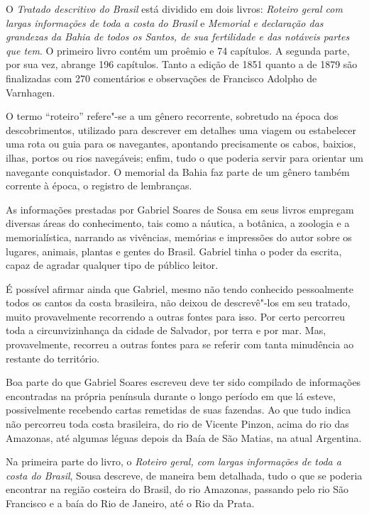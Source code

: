 \documentclass[12pt]{extarticle}
\begin{document}
O \textit{Tratado descritivo do Brasil} está dividido em dois livros: 
\textit{Roteiro geral com largas informações de toda a costa do Brasil} e \textit{Memorial e declaração das grandezas da Bahia de todos os Santos, de sua fertilidade e das notáveis partes que tem}. O primeiro livro contém um proêmio e 74 capítulos. A segunda parte, por sua vez, abrange 196 capítulos. Tanto a edição de 1851 quanto a de 1879 são finalizadas com 270 comentários e observações de Francisco Adolpho de Varnhagen.

O termo ``roteiro'' refere"-se a um gênero recorrente, sobretudo na época dos descobrimentos, utilizado para descrever em detalhes uma viagem ou estabelecer uma rota ou guia para os navegantes, apontando precisamente os cabos, baixios, ilhas, portos ou rios navegáveis; enfim, tudo o que poderia servir para orientar um navegante conquistador. O memorial da Bahia faz parte de um gênero também corrente à época, o registro de lembranças.

As informações prestadas por Gabriel Soares de Sousa em seus livros empregam diversas áreas do conhecimento, tais como a náutica, a botânica, a zoologia e a memorialística, narrando as vivências, memórias e impressões do autor sobre os lugares, animais, plantas e gentes do Brasil. Gabriel tinha o poder da escrita, capaz de agradar qualquer tipo de público leitor.

É possível afirmar ainda que Gabriel, mesmo não tendo conhecido pessoalmente todos os cantos da costa brasileira, não deixou de descrevê"-los em seu tratado, muito provavelmente recorrendo a outras fontes para isso. Por certo percorreu toda a circunvizinhança da cidade de Salvador, por terra e por mar. Mas, provavelmente, recorreu a outras fontes para se referir com tanta minudência ao restante do território.

Boa parte do que Gabriel Soares escreveu deve ter sido compilado de informações encontradas na própria península durante o longo período em que lá esteve, possivelmente recebendo cartas remetidas de suas fazendas. Ao que tudo indica não percorreu toda costa brasileira, do rio de Vicente Pinzon, acima do rio das Amazonas, até algumas léguas depois da Baía de São Matias, na atual Argentina. 

Na primeira parte do livro, o \emph{Roteiro geral, com largas informações de toda a costa do Brasil}, Sousa descreve, de maneira bem detalhada, tudo o que se poderia encontrar na região costeira do Brasil, do rio Amazonas, passando pelo rio São Francisco e a baía do Rio de Janeiro, até o Rio da Prata.
\end{document}
